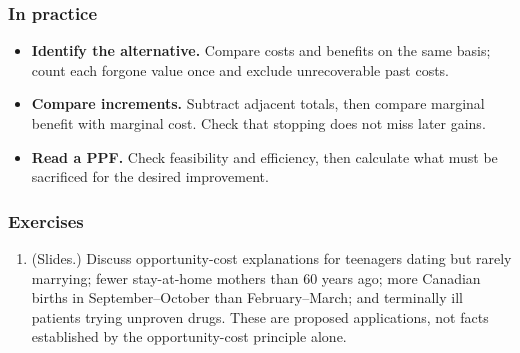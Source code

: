 \subsubsection*{In practice}
\begin{itemize}
\item \textbf{Identify the alternative.} Compare costs and benefits on the
same basis; count each forgone value once and exclude unrecoverable past costs.
\item \textbf{Compare increments.} Subtract adjacent totals, then compare
marginal benefit with marginal cost. Check that stopping does not miss later gains.
\item \textbf{Read a PPF.} Check feasibility and efficiency, then calculate
what must be sacrificed for the desired improvement.
\end{itemize}
\subsubsection*{Exercises}
\begin{enumerate}
\item (Slides.) Discuss opportunity-cost explanations for teenagers dating
but rarely marrying; fewer stay-at-home mothers than 60 years ago;
more Canadian births in September--October than February--March;
and terminally ill patients trying unproven drugs. These are proposed
applications, not facts established by the opportunity-cost principle alone.
\end{enumerate}
